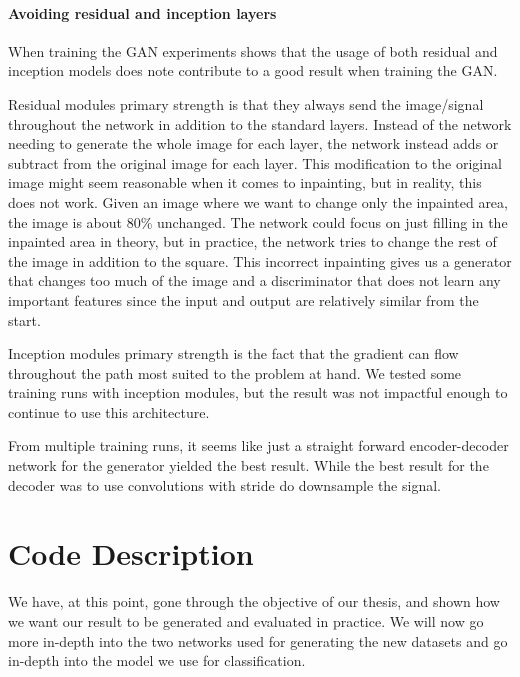\paragraph{Avoiding residual and inception layers}
When training the GAN experiments shows that the usage of both residual \cite{Rumelhart:1986:LIR:104279.104293} and inception \cite{DBLP:journals/corr/SzegedyLJSRAEVR14} models does note contribute to a good result when training the GAN.

Residual modules primary strength is that they always send the image/signal throughout the network in addition to the standard layers. Instead of the network needing to generate the whole image for each layer, the network instead adds or subtract from the original image for each layer.
This modification to the original image might seem reasonable when it comes to inpainting, but in reality, this does not work.  Given an image where we want to change only the inpainted area, the image is about 80\% unchanged. The network could focus on just filling in the inpainted area in theory, but in practice, the network tries to change the rest of the image in addition to the square. This incorrect inpainting gives us a generator that changes too much of the image and a discriminator that does not learn any important features since the input and output are relatively similar from the start.

Inception modules primary strength is the fact that the gradient can flow throughout the path most suited to the problem at hand.
We tested some training runs with inception modules, but the result was not impactful enough to continue to use this architecture.

From multiple training runs, it seems like just a straight forward encoder-decoder network for the generator yielded the best result. While the best result for the decoder was to use convolutions with stride do downsample the signal.




\FloatBarrier
\section{Code Description}
We have, at this point, gone through the objective of our thesis, and shown how we want our result to be generated and evaluated in practice. 
We will now go more in-depth into the two networks used for generating the new datasets and go in-depth into the model we use for classification.



